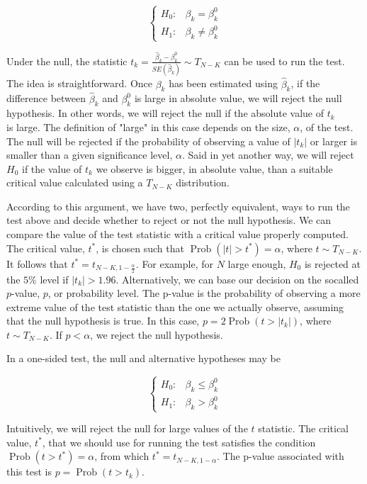 $$
\begin{cases}H_{0}: & \beta_{k}=\beta_{k}^{0} \\ H_{1}: & \beta_{k} \neq \beta_{k}^{0}\end{cases}
$$

Under the null, the statistic $t_{k}=\frac{\widehat{\beta}_{k}-\beta_{k}^{0}}{S E\left(\widehat{\beta}_{k}\right)} \sim T_{N-K}$ can be used to run the test. The idea is straightforward. Once $\beta_{k}$ has been estimated using $\widehat{\beta}_{k}$, if the difference between $\widehat{\beta}_{k}$ and $\beta_{k}^{0}$ is large in absolute value, we will reject the null hypothesis. In other words, we will reject the null if the absolute value of $t_{k}$\\
is large. The definition of "large" in this case depends on the size, $\alpha$, of the test. The null will be rejected if the probability of observing a value of $\left|t_{k}\right|$ or larger is smaller than a given significance level, $\alpha$. Said in yet another way, we will reject $H_{0}$ if the value of $t_{k}$ we observe is bigger, in absolute value, than a suitable critical value calculated using a $T_{N-K}$ distribution.

According to this argument, we have two, perfectly equivalent, ways to run the test above and decide whether to reject or not the null hypothesis. We can compare the value of the test statistic with a critical value properly computed. The critical value, $t^{*}$, is chosen such that $\operatorname{Prob}\left(|t|>t^{*}\right)=\alpha$, where $t \sim T_{N-K}$. It follows that $t^{*}=t_{N-K, 1-\frac{\alpha}{2}}$. For example, for $N$ large enough, $H_{0}$ is rejected at the $5 \%$ level if $\left|t_{k}\right|>1.96$. Alternatively, we can base our decision on the socalled $p$-value, $p$, or probability level. The p-value is the probability of observing a more extreme value of the test statistic than the one we actually observe, assuming that the null hypothesis is true. In this case, $p=2 \operatorname{Prob}\left(t>\left|t_{k}\right|\right)$, where $t \sim T_{N-K}$. If $p<\alpha$, we reject the null hypothesis.

In a one-sided test, the null and alternative hypotheses may be

$$
\begin{cases}H_{0}: & \beta_{k} \leq \beta_{k}^{0} \\ H_{1}: & \beta_{k}>\beta_{k}^{0}\end{cases}
$$

Intuitively, we will reject the null for large values of the $t$ statistic. The critical value, $t^{*}$, that we should use for running the test satisfies the condition $\operatorname{Prob}\left(t>t^{*}\right)=\alpha$, from which $t^{*}=t_{N-K, 1-\alpha}$. The p-value associated with this test is $p=\operatorname{Prob}\left(t>t_{k}\right)$.

